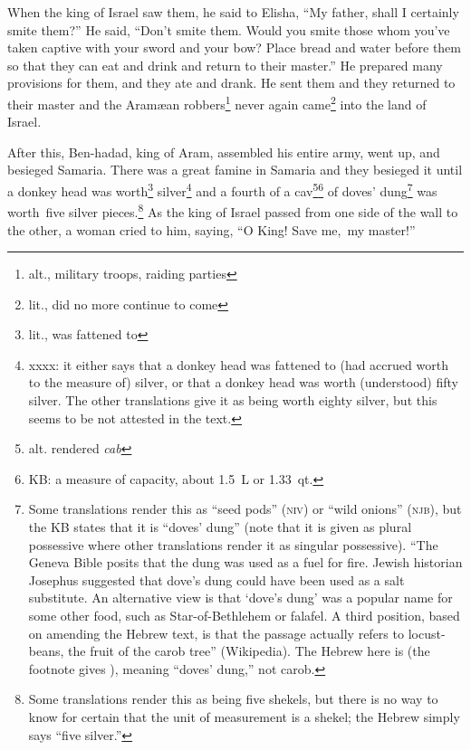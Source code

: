 \begin{inparaenum}
     When the king of Israel saw them, he said to Elisha, ``My father, shall I certainly smite them?''%
     He said, ``Don't smite them. Would you smite those whom you've taken captive with your sword and your bow? Place bread and water before them so that they can eat and drink and return to their master.''%
     He prepared many provisions for them, and they ate and drank. He sent them and they returned to their master and the Aram\ae{}an robbers\footnote{alt., military troops, raiding parties} never again came\footnote{lit., did no more continue to come} into the land of Israel.%
    
     After this, Ben-hadad, king of Aram, assembled his entire army, went up, and besieged Samaria.%
     There was a great famine in Samaria and they besieged it until a donkey head was worth\footnote{lit., was fattened to} silver\footnote{xxxx: it either says that a donkey head was fattened to (had accrued worth to the measure of) silver, or that a donkey head was worth (understood) fifty silver. The other translations give it as being worth eighty silver, but this seems to be not attested in the text.} and a fourth of a cav\footnote{alt. rendered \textit{cab}}\footnote{KB: a measure of capacity, about 1.5~L or 1.33~qt.} of doves' dung\footnote{Some translations render this as ``seed pods'' (\textsc{niv}) or ``wild onions'' (\textsc{njb}), but the KB states that it is ``doves' dung'' (note that it is given as plural possessive where other translations render it as singular possessive). ``The Geneva Bible posits that the dung was used as a fuel for fire. Jewish historian Josephus suggested that dove's dung could have been used as a salt substitute. An alternative view is that `dove's dung' was a popular name for some other food, such as Star-of-Bethlehem or falafel. A third position, based on amending the Hebrew text, is that the passage actually refers to locust-beans, the fruit of the carob tree'' (Wikipedia). The Hebrew here is  (the footnote gives ), meaning ``doves' dung,'' not carob.} was worth\understood\ five silver pieces.\footnote{Some translations render this as being five shekels, but there is no way to know for certain that the unit of measurement is a shekel; the Hebrew simply says ``five silver.''}%
     As the king of Israel passed from one side of the wall to the other, a woman cried to him, saying, ``O King! Save me,\understood\ my master!''%
\end{inparaenum}
